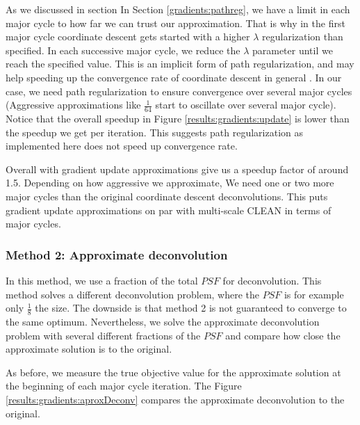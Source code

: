 As we discussed in section In Section \ref{gradients:pathreg}, we have a limit in each major cycle to how far we can trust our approximation. That is why in the first major cycle coordinate descent gets started with a higher $\lambda$ regularization than specified. In each successive major cycle, we reduce the $\lambda$ parameter until we reach the specified value. This is an implicit form of path regularization, and may help speeding up the convergence rate of coordinate descent in general \cite{friedman2010regularization}. In our case, we need path regularization to ensure convergence over several major cycles (Aggressive approximations like $\frac{1}{64}$ start to oscillate over several major cycle). Notice that the overall speedup in Figure \ref{results:gradients:update} is lower than the speedup we get per iteration. This suggests path regularization as implemented here does not speed up convergence rate.

Overall with gradient update approximations give us a speedup factor of around 1.5. Depending on how aggressive we approximate, We need one or two more major cycles than the original coordinate descent deconvolutions. This puts gradient update approximations on par with multi-scale CLEAN in terms of major cycles. 

\subsubsection{Method 2: Approximate deconvolution}
In this method, we use a fraction of the total $PSF$ for deconvolution. This method solves a different deconvolution problem, where the $PSF$ is for example only $\frac{1}{8}$ the size. The downside is that method 2 is not guaranteed to converge to the same optimum. Nevertheless, we solve the approximate deconvolution problem with several different fractions of the $PSF$ and compare how close the approximate solution is to the original.

As before, we measure the true objective value for the approximate solution at the beginning of each major cycle iteration. The Figure \ref{results:gradients:aproxDeconv} compares the approximate deconvolution to the original.


